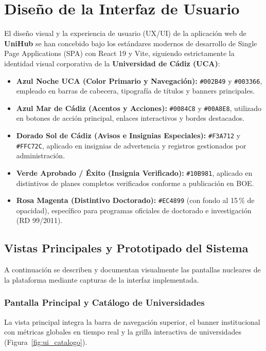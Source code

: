 \section{Diseño de la Interfaz de Usuario} 
El diseño visual y la experiencia de usuario (UX/UI) de la aplicación web de \textbf{UniHub} se han concebido bajo los estándares modernos de desarrollo de Single Page Applications (SPA) con React 19 y Vite, siguiendo estrictamente la identidad visual corporativa de la \textbf{Universidad de Cádiz (UCA)}:
\begin{itemize}
    \item \textbf{Azul Noche UCA (Color Primario y Navegación):} \texttt{\#002B49} y \texttt{\#003366}, empleado en barras de cabecera, tipografía de títulos y banners principales.
    \item \textbf{Azul Mar de Cádiz (Acentos y Acciones):} \texttt{\#0084C8} y \texttt{\#00A8E8}, utilizado en botones de acción principal, enlaces interactivos y bordes destacados.
    \item \textbf{Dorado Sol de Cádiz (Avisos e Insignias Especiales):} \texttt{\#F3A712} y \texttt{\#FFC72C}, aplicado en insignias de advertencia y registros gestionados por administración.
    \item \textbf{Verde Aprobado / Éxito (Insignia Verificado):} \texttt{\#10B981}, aplicado en distintivos de planes completos verificados conforme a publicación en BOE.
    \item \textbf{Rosa Magenta (Distintivo Doctorado):} \texttt{\#EC4899} (con fondo al 15\,\% de opacidad), específico para programas oficiales de doctorado e investigación (RD 99/2011).
\end{itemize}

\subsection{Vistas Principales y Prototipado del Sistema}
A continuación se describen y documentan visualmente las pantallas nucleares de la plataforma mediante capturas de la interfaz implementada.

\subsubsection{Pantalla Principal y Catálogo de Universidades}
La vista principal integra la barra de navegación superior, el banner institucional con métricas globales en tiempo real y la grilla interactiva de universidades (Figura~\ref{fig:ui_catalogo}).

